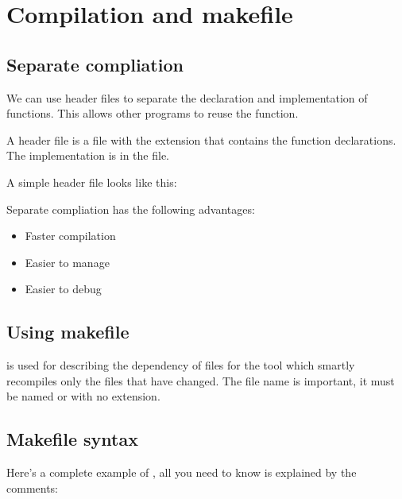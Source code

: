 \documentclass{article}
\begin{document}
\section{Compilation and makefile}
\subsection{Separate compliation}
We can use header files to separate the declaration and implementation of functions. This allows other programs to reuse the function. 

A header file is a file with the extension  that contains the function declarations. The implementation is in the  file. 

A simple header file looks like this:


Separate compliation has the following advantages:
\begin{itemize}
    \item Faster compilation
    \item Easier to manage
    \item Easier to debug
\end{itemize}
\subsection{Using makefile}
 is used for describing the dependency of files for the  tool which smartly recompiles only the files that have changed.
The file name is important, it must be named  or  with no extension.
\subsection{Makefile syntax}
Here's a complete example of , all you need to know is explained by the comments:

\end{document}
